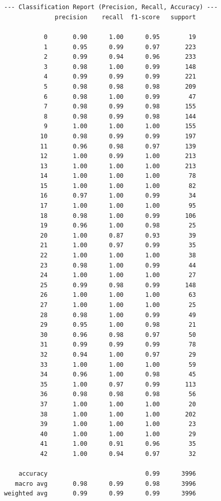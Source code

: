 \documentclass[11pt]{article}
\begin{document}
    \begin{center}
    \end{center}
    { \hspace*{\fill} \\}
    
    \begin{Verbatim}[commandchars=\\\{\}]

--- Classification Report (Precision, Recall, Accuracy) ---
              precision    recall  f1-score   support

           0       0.90      1.00      0.95        19
           1       0.95      0.99      0.97       223
           2       0.99      0.94      0.96       233
           3       0.98      1.00      0.99       148
           4       0.99      0.99      0.99       221
           5       0.98      0.98      0.98       209
           6       0.98      1.00      0.99        47
           7       0.98      0.99      0.98       155
           8       0.98      0.99      0.98       144
           9       1.00      1.00      1.00       155
          10       0.98      0.99      0.99       197
          11       0.96      0.98      0.97       139
          12       1.00      0.99      1.00       213
          13       1.00      1.00      1.00       213
          14       1.00      1.00      1.00        78
          15       1.00      1.00      1.00        82
          16       0.97      1.00      0.99        34
          17       1.00      1.00      1.00        95
          18       0.98      1.00      0.99       106
          19       0.96      1.00      0.98        25
          20       1.00      0.87      0.93        39
          21       1.00      0.97      0.99        35
          22       1.00      1.00      1.00        38
          23       0.98      1.00      0.99        44
          24       1.00      1.00      1.00        27
          25       0.99      0.98      0.99       148
          26       1.00      1.00      1.00        63
          27       1.00      1.00      1.00        25
          28       0.98      1.00      0.99        49
          29       0.95      1.00      0.98        21
          30       0.96      0.98      0.97        50
          31       0.99      0.99      0.99        78
          32       0.94      1.00      0.97        29
          33       1.00      1.00      1.00        59
          34       0.96      1.00      0.98        45
          35       1.00      0.97      0.99       113
          36       0.98      0.98      0.98        56
          37       1.00      1.00      1.00        20
          38       1.00      1.00      1.00       202
          39       1.00      1.00      1.00        23
          40       1.00      1.00      1.00        29
          41       1.00      0.91      0.96        35
          42       1.00      0.94      0.97        32

    accuracy                           0.99      3996
   macro avg       0.98      0.99      0.98      3996
weighted avg       0.99      0.99      0.99      3996

    \end{Verbatim}
\end{document}
